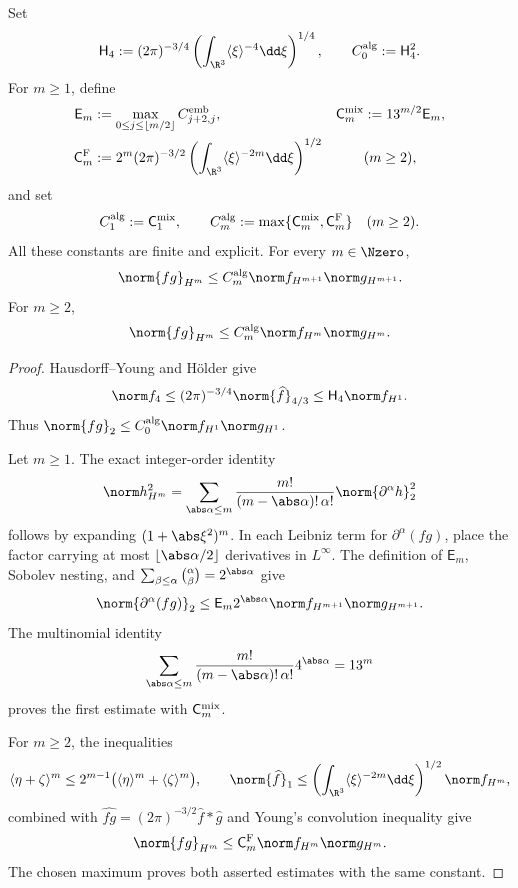 \begin{lemma}
\label{lem:sobolev-product}
Set
\[
 \mathsf H_4:=(2\pi)^{-3/4}
 \left(\int_{\R^3}\langle\xi\rangle^{-4}\dd\xi\right)^{1/4},
 \qquad C_0^{\rm alg}:=\mathsf H_4^2.
\]
For \(m\ge1\), define
\begin{align*}
 \mathsf E_m
 &:=\max_{0\le j\le\lfloor m/2\rfloor}C_{j+2,j}^{\rm emb},
 &\mathsf C_m^{\rm mix}&:=13^{m/2}\mathsf E_m,\\
 \mathsf C_m^{\rm F}
 &:=2^m(2\pi)^{-3/2}
 \left(\int_{\R^3}\langle\xi\rangle^{-2m}\dd\xi\right)^{1/2}
 &&(m\ge2),
\end{align*}
and set
\[
 C_1^{\rm alg}:=\mathsf C_1^{\rm mix},
 \qquad
 C_m^{\rm alg}:=\max\{\mathsf C_m^{\rm mix},\mathsf C_m^{\rm F}\}
 \quad(m\ge2).
\]
All these constants are finite and explicit.  For every \(m\in\Nzero\),
\[
 \norm{fg}_{H^m}
 \le C_m^{\rm alg}\norm f_{H^{m+1}}\norm g_{H^{m+1}}.
\]
For \(m\ge2\),
\[
 \norm{fg}_{H^m}
 \le C_m^{\rm alg}\norm f_{H^m}\norm g_{H^m}.
\]
\end{lemma}

\begin{proof}
Hausdorff--Young and H\"older give
\[
 \norm f_4
 \le(2\pi)^{-3/4}\norm{\widehat f}_{4/3}
 \le\mathsf H_4\norm f_{H^1}.
\]
Thus \(\norm{fg}_2\le C_0^{\rm alg}\norm f_{H^1}\norm g_{H^1}\).

Let \(m\ge1\).  The exact integer-order identity
\[
 \norm h_{H^m}^2
 =\sum_{\abs\alpha\le m}
 \frac{m!}{(m-\abs\alpha)!\,\alpha!}
 \norm{\partial^\alpha h}_2^2
\]
follows by expanding \((1+\abs\xi^2)^m\).  In each Leibniz term for
\(\partial^\alpha(fg)\), place the factor carrying at most
\(\lfloor\abs\alpha/2\rfloor\) derivatives in \(L^\infty\).  The definition
of \(\mathsf E_m\), Sobolev nesting, and
\(\sum_{\beta\le\alpha}\binom\alpha\beta=2^{\abs\alpha}\) give
\[
 \norm{\partial^\alpha(fg)}_2
 \le \mathsf E_m2^{\abs\alpha}
 \norm f_{H^{m+1}}\norm g_{H^{m+1}}.
\]
The multinomial identity
\[
 \sum_{\abs\alpha\le m}
 \frac{m!}{(m-\abs\alpha)!\,\alpha!}4^{\abs\alpha}=13^m
\]
proves the first estimate with \(\mathsf C_m^{\rm mix}\).

For \(m\ge2\), the inequalities
\[
 \langle\eta+\zeta\rangle^m
 \le2^{m-1}\bigl(\langle\eta\rangle^m+
                         \langle\zeta\rangle^m\bigr),
 \qquad
 \norm{\widehat f}_1
 \le\left(\int_{\R^3}\langle\xi\rangle^{-2m}\dd\xi\right)^{1/2}
       \norm f_{H^m},
\]
combined with \(\widehat{fg}=(2\pi)^{-3/2}\widehat f*\widehat g\)
and Young's convolution inequality give
\[
 \norm{fg}_{H^m}
 \le\mathsf C_m^{\rm F}\norm f_{H^m}\norm g_{H^m}.
\]
The chosen maximum proves both asserted estimates with the same constant.
\end{proof}

